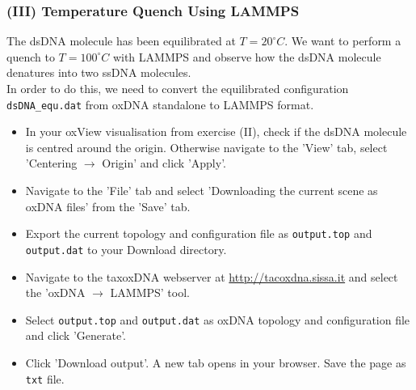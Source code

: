 \documentclass[slidestop,compress,9pt]{beamer}
\begin{document}
\begin{frame}[fragile]
\frametitle{(III) Temperature Quench Using LAMMPS}
\small

The dsDNA molecule has been equilibrated at $T=20^\circ C$. We want to perform a quench to $T=100^\circ C$ with LAMMPS and observe how the dsDNA molecule denatures into two ssDNA molecules.\\[10pt]
In order to do this, we need to convert the equilibrated configuration \texttt{dsDNA\_equ.dat} from oxDNA standalone to LAMMPS format.\\[10pt]

\begin{itemize}
\setlength\itemsep{5pt}
\item In your oxView visualisation from exercise (II), check if the dsDNA molecule is centred around the origin. Otherwise navigate to the 'View' tab, select 'Centering $\rightarrow$ Origin' and click 'Apply'.
\item Navigate to the 'File' tab and select 'Downloading the current scene as oxDNA files' from the 'Save' tab. 
\item Export the current topology and configuration file as \texttt{output.top} and \texttt{output.dat} to your Download directory.
\item Navigate to the taxoxDNA webserver at \href{http://tacoxdna.sissa.it}{http://tacoxdna.sissa.it} and select the 'oxDNA $\rightarrow$ LAMMPS' tool.
\item Select \texttt{output.top} and \texttt{output.dat} as oxDNA topology and configuration file and click 'Generate'.
\item Click 'Download output'. A new tab opens in your browser. Save the page as \texttt{txt} file.  
\end{itemize}

\end{frame}
\end{document}
